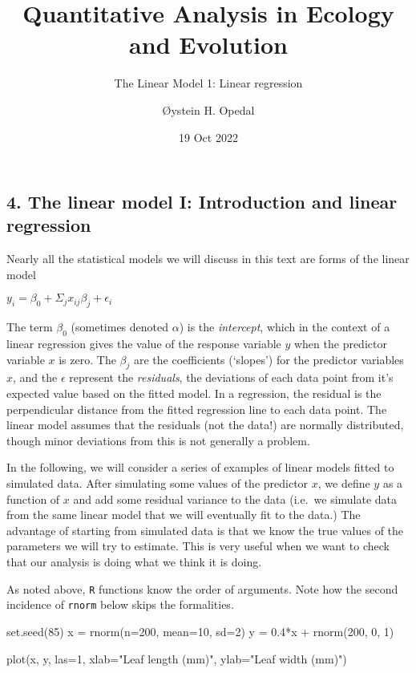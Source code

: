 \documentclass[
]{article}
\title{Quantitative Analysis in Ecology and Evolution}
\subtitle{The Linear Model 1: Linear regression}
\author{Øystein H. Opedal}
\date{19 Oct 2022}
\newenvironment{Shaded}{\begin{snugshade}}{\end{snugshade}}
\newcommand{\AttributeTok}[1]{\textcolor[rgb]{0.77,0.63,0.00}{#1}}
\newcommand{\DecValTok}[1]{\textcolor[rgb]{0.00,0.00,0.81}{#1}}
\newcommand{\FloatTok}[1]{\textcolor[rgb]{0.00,0.00,0.81}{#1}}
\newcommand{\FunctionTok}[1]{\textcolor[rgb]{0.00,0.00,0.00}{#1}}
\newcommand{\NormalTok}[1]{#1}
\newcommand{\OtherTok}[1]{\textcolor[rgb]{0.56,0.35,0.01}{#1}}
\newcommand{\SpecialCharTok}[1]{\textcolor[rgb]{0.00,0.00,0.00}{#1}}
\newcommand{\StringTok}[1]{\textcolor[rgb]{0.31,0.60,0.02}{#1}}
\begin{document}
\maketitle

\hypertarget{the-linear-model-i-introduction-and-linear-regression}{%
\subsection{4. The linear model I: Introduction and linear
regression}\label{the-linear-model-i-introduction-and-linear-regression}}

Nearly all the statistical models we will discuss in this text are forms
of the linear model

\(y_i = \beta_0 + \Sigma_j x_{ij} \beta_j + \epsilon_i\)

The term \(\beta_0\) (sometimes denoted \(\alpha\)) is the
\emph{intercept}, which in the context of a linear regression gives the
value of the response variable \(y\) when the predictor variable \(x\)
is zero. The \(\beta_j\) are the coefficients (`slopes') for the
predictor variables \(x\), and the \(\epsilon\) represent the
\emph{residuals}, the deviations of each data point from it's expected
value based on the fitted model. In a regression, the residual is the
perpendicular distance from the fitted regression line to each data
point. The linear model assumes that the residuals (not the data!) are
normally distributed, though minor deviations from this is not generally
a problem.

In the following, we will consider a series of examples of linear models
fitted to simulated data. After simulating some values of the predictor
\(x\), we define \(y\) as a function of \(x\) and add some residual
variance to the data (i.e.~we simulate data from the same linear model
that we will eventually fit to the data.) The advantage of starting from
simulated data is that we know the true values of the parameters we will
try to estimate. This is very useful when we want to check that our
analysis is doing what we think it is doing.

As noted above, \texttt{R} functions know the order of arguments. Note
how the second incidence of \texttt{rnorm} below skips the formalities.

\begin{Shaded}
\begin{Highlighting}[]
\FunctionTok{set.seed}\NormalTok{(}\DecValTok{85}\NormalTok{)}
\NormalTok{x }\OtherTok{=} \FunctionTok{rnorm}\NormalTok{(}\AttributeTok{n=}\DecValTok{200}\NormalTok{, }\AttributeTok{mean=}\DecValTok{10}\NormalTok{, }\AttributeTok{sd=}\DecValTok{2}\NormalTok{)}
\NormalTok{y }\OtherTok{=} \FloatTok{0.4}\SpecialCharTok{*}\NormalTok{x }\SpecialCharTok{+} \FunctionTok{rnorm}\NormalTok{(}\DecValTok{200}\NormalTok{, }\DecValTok{0}\NormalTok{, }\DecValTok{1}\NormalTok{)}

\FunctionTok{plot}\NormalTok{(x, y, }\AttributeTok{las=}\DecValTok{1}\NormalTok{, }
     \AttributeTok{xlab=}\StringTok{"Leaf length (mm)"}\NormalTok{, }
     \AttributeTok{ylab=}\StringTok{"Leaf width (mm)"}\NormalTok{)}
\end{Highlighting}
\end{Shaded}
\end{document}

